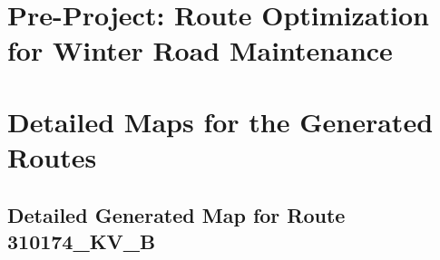









\chapter{Pre-Project: Route Optimization for Winter Road Maintenance} %
\label{cha:pre_project_route_optimization_for_winter_road_maintenance}















\chapter{Detailed Maps for the Generated Routes} %
\label{cha:detailed_maps_for_the_generated_routes}

\section{Detailed Generated Map for Route 310174\_KV\_B} %
\label{sec:detailed_generated_map_for_route_310174_kv_b}




